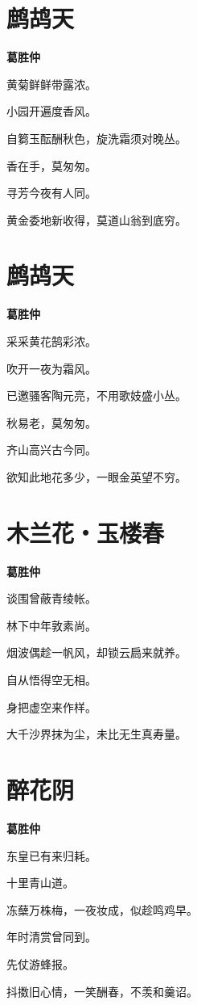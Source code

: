 \documentclass[12pt,a4paper]{ctexbook}
\begin{document}
\section{鹧鸪天}
\textbf{葛胜仲}\par\vspace{0.5em}
黄菊鲜鲜带露浓。\par
小园开遍度香风。\par
自篘玉酝酬秋色，旋洗霜须对晚丛。\par
香在手，莫匆匆。\par
寻芳今夜有人同。\par
黄金委地新收得，莫道山翁到底穷。\par

\section{鹧鸪天}
\textbf{葛胜仲}\par\vspace{0.5em}
采采黄花鹄彩浓。\par
吹开一夜为霜风。\par
已邀骚客陶元亮，不用歌妓盛小丛。\par
秋易老，莫匆匆。\par
齐山高兴古今同。\par
欲知此地花多少，一眼金英望不穷。\par

\section{木兰花・玉楼春}
\textbf{葛胜仲}\par\vspace{0.5em}
谈围曾蔽青绫帐。\par
林下中年敦素尚。\par
烟波偶趁一帆风，却锁云扃来就养。\par
自从悟得空无相。\par
身把虚空来作样。\par
大千沙界抹为尘，未比无生真寿量。\par

\section{醉花阴}
\textbf{葛胜仲}\par\vspace{0.5em}
东皇已有来归耗。\par
十里青山道。\par
冻蘖万株梅，一夜妆成，似趁鸣鸡早。\par
年时清赏曾同到。\par
先仗游蜂报。\par
抖擞旧心情，一笑酬春，不羡和羹诏。\par
\end{document}
